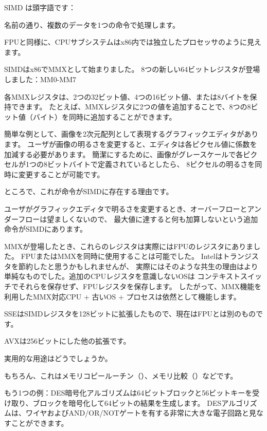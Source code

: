 ﻿

\label{SIMD_x86}
\ac{SIMD} は頭字語です：

名前の通り、複数のデータを1つの命令で処理します。

\ac{FPU}と同様に、\ac{CPU}サブシステムはx86内では独立したプロセッサのように見えます。


SIMDはx86でMMXとして始まりました。 8つの新しい64ビットレジスタが登場しました：MM0-MM7

各MMXレジスタは、2つの32ビット値、4つの16ビット値、または8バイトを保持できます。
たとえば、MMXレジスタに2つの値を追加することで、8つの8ビット値（バイト）を同時に追加することができます。

簡単な例として、画像を2次元配列として表現するグラフィックエディタがあります。
ユーザが画像の明るさを変更すると、エディタは各ピクセル値に係数を加減する必要があります。
簡潔にするために、画像がグレースケールで各ピクセルが1つの8ビットバイトで定義されているとしたら、
8ピクセルの明るさを同時に変更することが可能です。

ところで、これが命令がSIMDに存在する理由です。

ユーザがグラフィックエディタで明るさを変更するとき、オーバーフローとアンダーフローは望ましくないので、
最大値に達すると何も加算しないという追加命令がSIMDにあります。

MMXが登場したとき、これらのレジスタは実際にはFPUのレジスタにありました。 
FPUまたはMMXを同時に使用することは可能でした。 Intelはトランジスタを節約したと思うかもしれませんが、
実際にはそのような共生の理由はより単純なものでした。追加のCPUレジスタを意識しない\ac{OS}は
コンテキストスイッチでそれらを保存せず、FPUレジスタを保存します。
したがって、MMX機能を利用したMMX対応CPU + 古い\ac{OS} + プロセスは依然として機能します。

SSEはSIMDレジスタを128ビットに拡張したもので、現在はFPUとは別のものです。

AVXは256ビットにした他の拡張です。

実用的な用途はどうでしょうか。

もちろん、これはメモリコピールーチン（）、メモリ比較（）などです。


もう1つの例：DES暗号化アルゴリズムは64ビットブロックと56ビットキーを受け取り、ブロックを暗号化して64ビットの結果を生成します。 
DESアルゴリズムは、ワイヤおよびAND/OR/NOTゲートを有する非常に大きな電子回路と見なすことができます。

